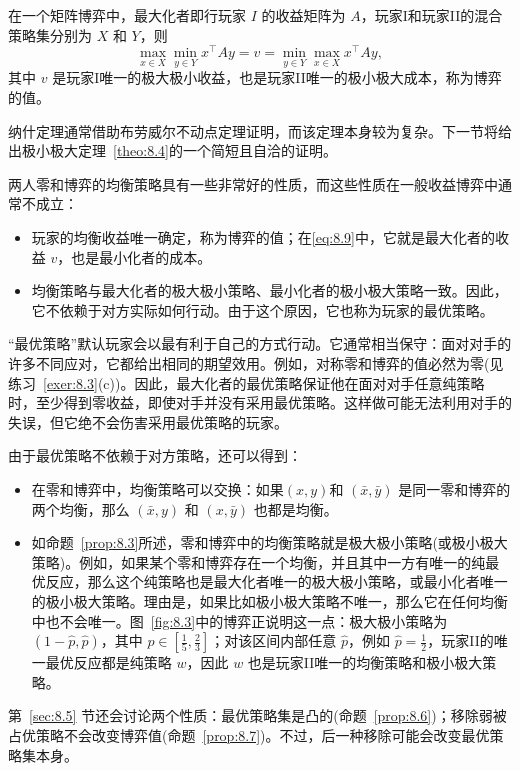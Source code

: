 \begin{theorem}\label{theo:8.4}在一个矩阵博弈中，最大化者即行玩家 \(I\) 的收益矩阵为 \(A\)，玩家I和玩家II的混合策略集分别为 \(X\) 和 \(Y\)，则
\begin{equation}\label{eq:8.9}
\max_{{x \in  X}}\min_{{y \in  Y}}{x}^{\top }{Ay} = v = \min_{{y \in  Y}}\max_{{x \in  X}}{x}^{\top }{Ay},
\end{equation}
其中 \(v\) 是玩家I唯一的极大极小收益，也是玩家II唯一的极小极大成本，称为博弈的值。
\end{theorem}

纳什定理通常借助布劳威尔不动点定理证明，而该定理本身较为复杂。下一节将给出极小极大定理~\ref{theo:8.4}的一个简短且自洽的证明。

两人零和博弈的均衡策略具有一些非常好的性质，而这些性质在一般收益博弈中通常不成立：
\begin{itemize}
\item 玩家的均衡收益唯一确定，称为博弈的值；在\eqref{eq:8.9}中，它就是最大化者的收益 \(v\)，也是最小化者的成本。
\item 均衡策略与最大化者的极大极小策略、最小化者的极小极大策略一致。因此，它不依赖于对方实际如何行动。由于这个原因，它也称为玩家的最优策略。
\end{itemize}

“最优策略”默认玩家会以最有利于自己的方式行动。它通常相当保守：面对对手的许多不同应对，它都给出相同的期望效用。例如，对称零和博弈的值必然为零(见练习~\ref{exer:8.3}(c))。因此，最大化者的最优策略保证他在面对对手任意纯策略时，至少得到零收益，即使对手并没有采用最优策略。这样做可能无法利用对手的失误，但它绝不会伤害采用最优策略的玩家。

由于最优策略不依赖于对方策略，还可以得到：
\begin{itemize}
\item 在零和博弈中，均衡策略可以交换：如果$(x, y)$和 \(\left( {\bar{x},\bar{y}}\right)\) 是同一零和博弈的两个均衡，那么 \(\left( {\bar{x},y}\right)\) 和 \(\left( {x,\bar{y}}\right)\) 也都是均衡。
\item 如命题~\ref{prop:8.3}所述，零和博弈中的均衡策略就是极大极小策略(或极小极大策略)。例如，如果某个零和博弈存在一个均衡，并且其中一方有唯一的纯最优反应，那么这个纯策略也是最大化者唯一的极大极小策略，或最小化者唯一的极小极大策略。理由是，如果比如极小极大策略不唯一，那么它在任何均衡中也不会唯一。图~\ref{fig:8.3}中的博弈正说明这一点：极大极小策略为 \(\left( {1 - \widehat{p},\widehat{p}}\right)\)，其中 \(p \in  \left\lbrack  {\frac{1}{5},\frac{2}{3}}\right\rbrack\)；对该区间内部任意 \(\widehat{p}\)，例如 \(\widehat{p} = \frac{1}{2}\)，玩家II的唯一最优反应都是纯策略 \(w\)，因此 \(w\) 也是玩家II唯一的均衡策略和极小极大策略。
\end{itemize}
第~\ref{sec:8.5} 节还会讨论两个性质：最优策略集是凸的(命题~\ref{prop:8.6})；移除弱被占优策略不会改变博弈值(命题~\ref{prop:8.7})。不过，后一种移除可能会改变最优策略集本身。

